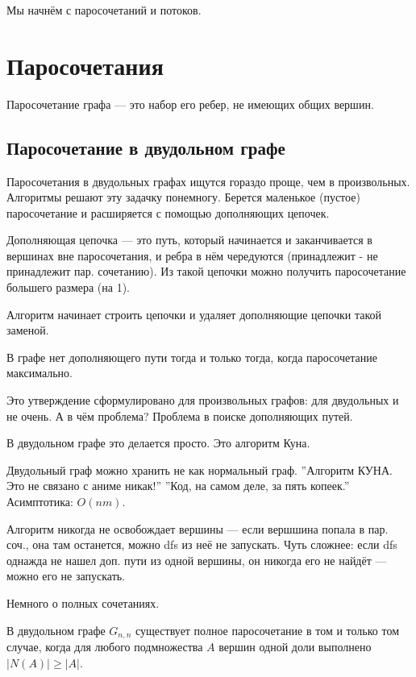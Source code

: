Мы начнём с паросочетаний и потоков.

\section{Паросочетания}
Паросочетание графа --- это набор его ребер, не имеющих общих вершин.

\subsection{Паросочетание в двудольном графе}
Паросочетания в двудольных графах ищутся гораздо проще, чем в произвольных.
Алгоритмы решают эту задачку понемногу. 
Берется маленькое (пустое) паросочетание и расширяется с помощью дополняющих цепочек.

Дополняющая цепочка --- это путь, который начинается и заканчивается в вершинах вне паросочетания, и ребра в нём чередуются (принадлежит - не принадлежит пар. сочетанию).
Из такой цепочки можно получить паросочетание большего размера (на 1).

Алгоритм начинает строить цепочки и удаляет дополняющие цепочки такой заменой.
\begin{theorem}
    В графе нет дополняющего пути тогда и только тогда, когда паросочетание максимально.
\end{theorem}
Это утверждение сформулировано для произвольных графов: для двудольных и не очень.
А в чём проблема? 
Проблема в поиске дополняющих путей.

В двудольном графе это делается просто. 
Это алгоритм Куна.

Двудольный граф можно хранить не как нормальный граф.
''Алгоритм КУНА. Это не связано с аниме никак!''
''Код, на самом деле, за пять копеек.''
Асимптотика: $O(nm)$.




Алгоритм никогда не освобождает вершины --- если вершшина попала в пар. соч., она там останется, можно dfs из неё не запускать.
Чуть сложнее: если dfs однажда не нашел доп. пути из одной вершины, он никогда его не найдёт --- можно его не запускать.


Немного о полных сочетаниях.
\begin{theorem}
В двудольном графе $G_{n,n}$ существует полное паросочетание в том и только том случае, когда для любого подмножества $A$ вершин одной доли выполнено $|N(A)| \geqslant |A|$. 
\end{theorem}

